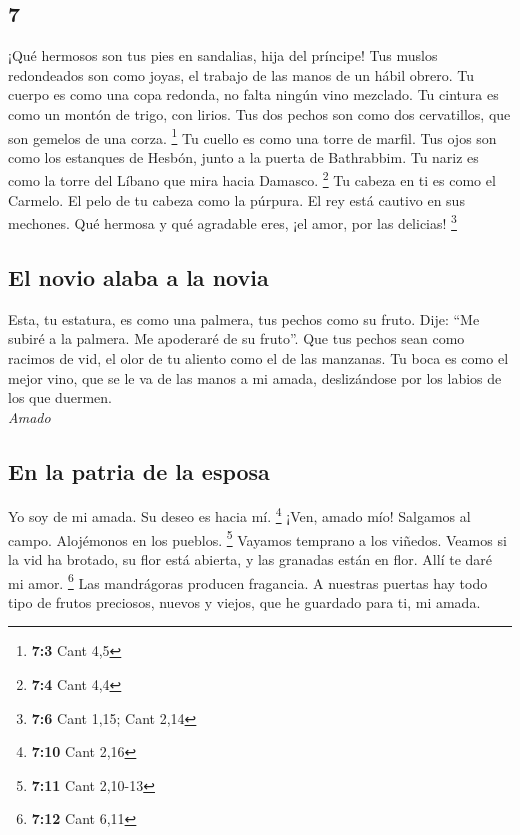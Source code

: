 \begin{paracol}{2}
\hypertarget{section-12}{%
\section{7}\label{section-12}}

 ¡Qué hermosos son tus pies en sandalias, hija del
príncipe! Tus muslos redondeados son como joyas, el trabajo de las manos
de un hábil obrero.  Tu cuerpo es como una copa redonda,
no falta ningún vino mezclado. Tu cintura es como un montón de trigo,
con lirios.  Tus dos pechos son como dos cervatillos, que
son gemelos de una corza. \footnote{\textbf{7:3} Cant 4,5}
 Tu cuello es como una torre de marfil. Tus ojos son como
los estanques de Hesbón, junto a la puerta de Bathrabbim. Tu nariz es
como la torre del Líbano que mira hacia Damasco. \footnote{\textbf{7:4}
  Cant 4,4}  Tu cabeza en ti es como el Carmelo. El pelo
de tu cabeza como la púrpura. El rey está cautivo en sus mechones.
 Qué hermosa y qué agradable eres, ¡el amor, por las
delicias! \footnote{\textbf{7:6} Cant 1,15; Cant 2,14}

\hypertarget{el-novio-alaba-a-la-novia}{%
\subsection{El novio alaba a la novia}\label{el-novio-alaba-a-la-novia}}

 Esta, tu estatura, es como una palmera, tus pechos como
su fruto.  Dije: ``Me subiré a la palmera. Me apoderaré de
su fruto''. Que tus pechos sean como racimos de vid, el olor de tu
aliento como el de las manzanas.  Tu boca es como el mejor
vino, que se le va de las manos a mi amada, deslizándose por los labios
de los que duermen.\\
\emph{Amado}\\

\hypertarget{en-la-patria-de-la-esposa}{%
\subsection{En la patria de la esposa}\label{en-la-patria-de-la-esposa}}

 Yo soy de mi amada. Su deseo es hacia mí. \footnote{\textbf{7:10}
  Cant 2,16}  ¡Ven, amado mío! Salgamos al campo.
Alojémonos en los pueblos. \footnote{\textbf{7:11} Cant 2,10-13}
 Vayamos temprano a los viñedos. Veamos si la vid ha
brotado, su flor está abierta, y las granadas están en flor. Allí te
daré mi amor. \footnote{\textbf{7:12} Cant 6,11}  Las
mandrágoras producen fragancia. A nuestras puertas hay todo tipo de
frutos preciosos, nuevos y viejos, que he guardado para ti, mi amada.


\end{paracol}
